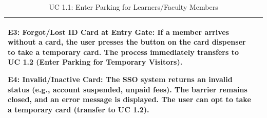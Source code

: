 \begin{table}[H]
\begin{tabularx}{\textwidth}{|>{\raggedright\arraybackslash}p{3.5cm}|>{\RaggedRight\arraybackslash}X|}
\textbf{E3: Forgot/Lost ID Card at Entry Gate:} If a member arrives without a card, the user presses the button on the card dispenser to take a temporary card. The process immediately transfers to UC 1.2 (Enter Parking for Temporary Visitors). \par \vspace{0.5em}
\textbf{E4: Invalid/Inactive Card:} The SSO system returns an invalid status (e.g., account suspended, unpaid fees). The barrier remains closed, and an error message is displayed. The user can opt to take a temporary card (transfer to UC 1.2). \\
\hline
\end{tabularx}
\caption{UC 1.1: Enter Parking for Learners/Faculty Members}
\label{tab:uc1.1}
\end{table}